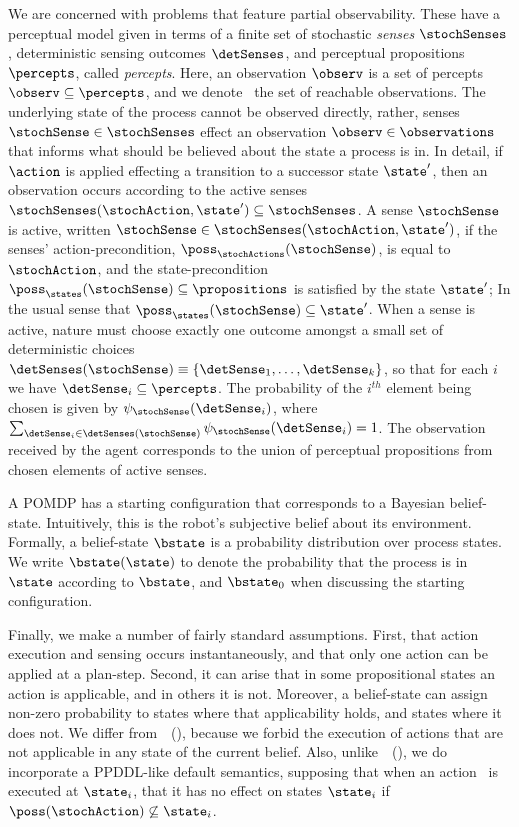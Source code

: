 We are concerned with problems that feature partial
observability. These have a perceptual model given in terms of a
finite set of stochastic {\em senses} $\stochSenses$, deterministic
sensing outcomes $\detSenses$, and perceptual propositions
$\percepts$, called {\em percepts}. Here, an observation $\observ$ is
a set of percepts $\observ \subseteq \percepts$, and we denote
\observations\ the set of reachable observations. The underlying state
of the process cannot be observed directly, rather, senses
$\stochSense \in \stochSenses$ effect an observation $\observ \in
\observations$ that informs what should be believed about the state a
process is in. In detail, if $\action$ is applied effecting a
transition to a successor state $\state'$, then an observation occurs
according to the active senses $\stochSenses(\stochAction, \state')
\subseteq \stochSenses$. A sense $\stochSense$ is active, written
$\stochSense \in \stochSenses(\stochAction, \state')$, if the senses'
action-precondition, $\poss_\stochActions(\stochSense)$, is equal to
$\stochAction$, and the state-precondition $\poss_\states(\stochSense)
\subseteq \propositions$ is satisfied by the state $\state'$; In the
usual sense that $\poss_\states(\stochSense) \subseteq \state'$.
When a sense is active, nature must choose exactly one outcome amongst
a small set of deterministic choices $\detSenses(\stochSense)
\equiv \{\detSense_1, \ldots, \detSense_k \}$, so that for each
$i$ we have $\detSense_i \subseteq \percepts$. The probability of
the $i^{th}$ element being chosen is given by
$\psi_{\stochSense}(\detSense_i)$, where $\sum_{\detSense_i \in
\detSenses(\stochSense)} \psi_{\stochSense}(\detSense_i) =
1$. The observation received by the agent corresponds to the union of
perceptual propositions from chosen elements of active senses.

A POMDP has a starting configuration that corresponds to a Bayesian
belief-state. Intuitively, this is the robot's subjective belief about
its environment. Formally, a belief-state $\bstate$ is a probability
distribution over process states. We write $\bstate(\state)$ to denote
the probability that the process is in $\state$ according to
$\bstate$, and $\bstate_0$ when discussing the starting
configuration. 

Finally, we make a number of fairly standard assumptions. First, that
action execution and sensing occurs instantaneously, and that only one
action can be applied at a plan-step. Second, it can arise that in
some propositional states an action is applicable, and in others it is
not. Moreover, a belief-state can assign non-zero probability to
states where that applicability holds, and states where it does
not. We differ
from~\citeauthor{younes:littman:04}~(\citeyear{younes:littman:04}),
because we forbid the execution of actions that are not applicable in
any state of the current belief.  Also,
unlike~\citeauthor{hoffmann:brafman:2006}~(\citeyear{hoffmann:brafman:2006}),
we do incorporate a PPDDL-like default semantics, supposing that when
an action \stochAction\ is executed at $\state_i$, that it has no
effect on states $\state_i$ if $\poss(\stochAction) \not\subseteq
\state_i$.


